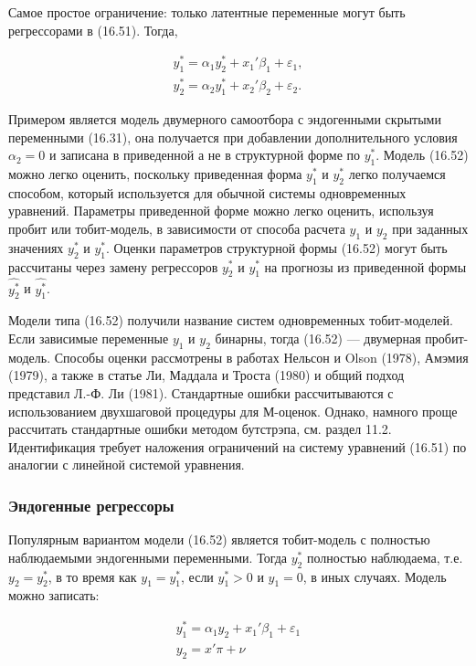 Самое простое ограничение: только латентные переменные могут быть регрессорами в (16.51). Тогда,

\begin{equation}
\begin{array}{l}
y_1^{*}=\alpha_{1}y_2^{*}+x_1'\beta_1+\varepsilon_1,\\
y_2^{*}=\alpha_{2}y_1^{*}+x_2'\beta_2+\varepsilon_2.
\end{array}
\end{equation}

Примером является модель двумерного самоотбора с эндогенными скрытыми переменными (16.31), она получается при добавлении  дополнительного условия $\alpha_2=0$ и записана в приведенной а не в структурной форме по $y_1^*$. Модель (16.52) можно легко оценить, поскольку приведенная форма $y_1^{*}$ и $y_2^{*}$ легко получаемся способом, который используется для обычной системы одновременных уравнений. Параметры приведенной форме можно легко оценить, используя пробит или тобит-модель, в зависимости от способа расчета $y_1$ и $y_2$ при заданных значениях $y_2^{*}$ и $y_1^{*}$. Оценки параметров структурной формы (16.52) могут быть рассчитаны через замену регрессоров $y_2^{*}$ и $y_1^{*}$ на прогнозы из приведенной формы $\hat{y_2^{*}}$ и $\hat{y_1^{*}}$. 

Модели типа (16.52) получили название систем одновременных тобит-моделей. Если зависимые переменные $y_1$ и $y_2$ бинарны, тогда (16.52) --- двумерная пробит-модель. Способы оценки рассмотрены в работах Нельсон и Olson (1978), Амэмия (1979), а также в статье Ли, Маддала и Троста (1980) и общий подход представил Л.-Ф. Ли (1981). Стандартные ошибки рассчитываются с использованием двухшаговой процедуры для М-оценок. Однако, намного проще рассчитать стандартные ошибки методом бутстрэпа, см. раздел 11.2. Идентификация требует наложения ограничений на систему уравнений (16.51) по аналогии с линейной системой уравнения.

\subsubsection*{Эндогенные регрессоры}

Популярным вариантом модели (16.52) является тобит-модель с полностью наблюдаемыми эндогенными переменными. Тогда  $y_2^{*}$ полностью наблюдаема, т.е. $y_2=y_2^{*}$, в то время как $y_1=y_1^{*}$, если $y_1^{*}>0$ и $y_1=0$, в иных случаях. Модель можно записать:

\begin{equation}
\begin{array}{l}
y_1^{*}=\alpha_1{y_2}+x_1'\beta_1+\varepsilon_1 \\
y_2=x'\pi+\nu 
\end{array}
\end{equation}

